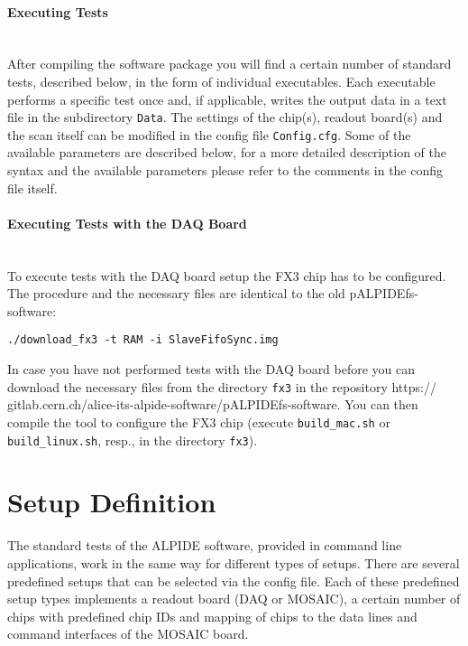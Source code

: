 \documentclass{article}
\begin{document}
\paragraph{Executing Tests}\hfill \\
After compiling the software package you will find a certain number of standard tests, described below, in the form of individual executables. Each executable performs a specific test once and, if applicable, writes the output data in a text file in the subdirectory \texttt{Data}. The settings of the chip(s), readout board(s) and the scan itself can be modified in the config file \texttt{Config.cfg}. Some of the available parameters are described below, for a more detailed description of the syntax and the available parameters please refer to the comments in the config file itself.



\paragraph{Executing Tests with the DAQ Board}\hfill \\
To execute tests with the DAQ board setup the FX3 chip has to be configured. The procedure and the necessary files are identical to the old pALPIDEfs-software: 
\begin{verbatim}
./download_fx3 -t RAM -i SlaveFifoSync.img
\end{verbatim}

In case you have not performed tests with the DAQ board before you can download the necessary files from the directory \texttt{fx3} in the repository https:// gitlab.cern.ch/alice-its-alpide-software/pALPIDEfs-software. You can then compile the tool to configure the FX3 chip (execute \texttt{build\_mac.sh} or \texttt{build\_linux.sh}, resp., in the directory \texttt{fx3}). 


\section{Setup Definition}

The standard tests of the ALPIDE software, provided in command line applications, work in the same way for different types of setups. There are several predefined setups that can be selected via the config file. Each of these predefined setup types implements a readout board (DAQ or MOSAIC), a certain number of chips with predefined chip IDs and mapping of chips to the data lines and command interfaces of the MOSAIC board. 
\end{document}
